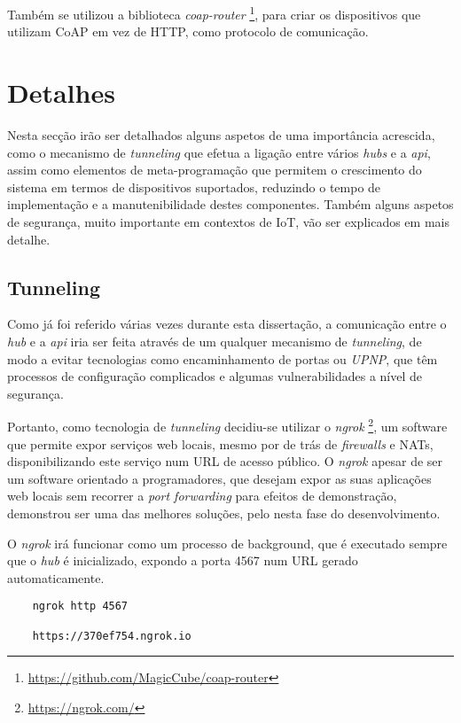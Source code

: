 Também se utilizou a biblioteca \textit{coap-router} \footnote{\url{https://github.com/MagicCube/coap-router}}, para criar os dispositivos que utilizam CoAP em vez de HTTP, como protocolo de comunicação.

\section{Detalhes}

Nesta secção irão ser detalhados alguns aspetos de uma importância acrescida, como o mecanismo de \textit{tunneling} que efetua a ligação entre vários \textit{hubs} e a \textit{api}, assim como elementos de meta-programação que permitem o crescimento do sistema em termos de dispositivos suportados, reduzindo o tempo de implementação e a manutenibilidade destes componentes. Também alguns aspetos de segurança, muito importante em contextos de IoT, vão ser explicados em mais detalhe.

\subsection{Tunneling}

Como já foi referido várias vezes durante esta dissertação, a comunicação entre o \textit{hub} e a \textit{api} iria ser feita através de um qualquer mecanismo de \textit{tunneling}, de modo a evitar tecnologias como encaminhamento de portas ou \textit{UPNP}, que têm processos de configuração complicados e algumas vulnerabilidades a nível de segurança.

Portanto, como tecnologia de \textit{tunneling} decidiu-se utilizar o \textit{ngrok} \footnote{\url{https://ngrok.com/}}, um software que permite expor serviços web locais, mesmo por de trás de \textit{firewalls} e NATs, disponibilizando este serviço num URL de acesso público. O \textit{ngrok} apesar de ser um software orientado a programadores, que desejam expor as suas aplicações web locais sem recorrer a \textit{port forwarding} para efeitos de demonstração, demonstrou ser uma das melhores soluções, pelo nesta fase do desenvolvimento.

O \textit{ngrok} irá funcionar como um processo de background, que é executado sempre que o \textit{hub} é inicializado, expondo a porta 4567 num URL gerado automaticamente.

\begin{verbatim}
    ngrok http 4567

    https://370ef754.ngrok.io
\end{verbatim}


